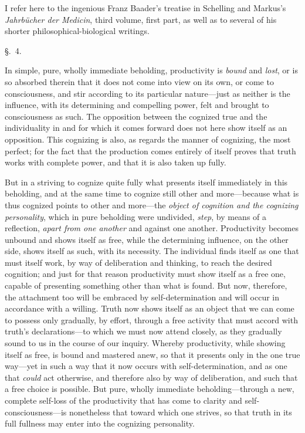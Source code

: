\documentclass[12pt,a4paper]{book}
\begin{document}
I refer here to the ingenious Franz Baader's treatise in Schelling and Markus's
\textit{Jahrbücher der Medicin}, third volume, first part, as well as to several
of his shorter philosophical-biological writings.

\begin{center}\large\S.~4.\end{center}
In simple, pure, wholly immediate beholding, productivity is \emph{bound} and
\emph{lost}, or is so absorbed therein that it does not come into view on its
own, or come to consciousness, and stir according to its particular nature---just
as neither is the influence, with its determining and compelling power, felt and
brought to consciousness as such. The opposition between the cognized true and
the individuality in and for which it comes forward does not here show itself as
an opposition. This cognizing is also, as regards the manner of cognizing, the
most perfect; for the fact that the production comes entirely of itself proves
that truth works with complete power, and that it is also taken up fully.

But in a striving to cognize quite fully what presents itself immediately in this
beholding, and at the same time to cognize still other and more---because what is
thus cognized points to other and more---the \emph{object of cognition and the
cognizing personality}, which in pure beholding were undivided, \emph{step}, by means of
a reflection, \emph{apart from one another} and against one another. Productivity
becomes unbound and shows itself as free, while the determining influence, on the
other side, shows itself as such, with its necessity. The individual finds itself
as one that must itself work, by way of deliberation and thinking, to reach the
desired cognition; and just for that reason productivity must show itself as a
free one, capable of presenting something other than what is found. But now,
therefore, the attachment too will be embraced by self-determination and will
occur in accordance with a willing. Truth now shows itself as an object that we
can come to possess only gradually, by effort, through a free activity that must
accord with truth's declarations---to which we must now attend closely, as they
gradually sound to us in the course of our inquiry. Whereby productivity, while
showing itself as free, is bound and mastered anew, so that it presents only in
the one true way---yet in such a way that it now occurs with self-determination,
and as one that \emph{could} act otherwise, and therefore also by way of deliberation,
and such that a free choice is possible. But pure, wholly immediate
beholding---through a new, complete self-loss of the productivity that has come
to clarity and self-consciousness---is nonetheless that toward which one strives,
so that truth in its full fullness may enter into the cognizing personality.
\end{document}
